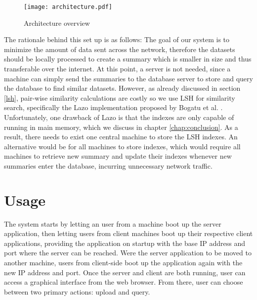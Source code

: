 \begin{figure}[h]
    \centering
    \texttt{[image: architecture.pdf]}
    \caption{Architecture overview}
    \label{fig:architecture}
\end{figure}

The rationale behind this set up is as follows: The goal of our system is to minimize the amount of data sent across the network, therefore the datasets should be locally processed to create a summary which is smaller in size and thus transferable over the internet. At this point, a server is not needed, since a machine can simply send the summaries to the database server to store and query the database to find similar datasets. However, as already discussed in section \ref{lsh}, pair-wise similarity calculations are costly so we use LSH for similarity search, specifically the Lazo implementation proposed by Bogatu et al. \cite{lazo}. Unfortunately, one drawback of Lazo is that the indexes are only capable of running in main memory, which we discuss in chapter \ref{chap:conclusion}. As a result, there needs to exist one central machine to store the LSH indexes. An alternative would be for all machines to store indexes, which would require all machines to retrieve new summary and update their indexes whenever new summaries enter the database, incurring unnecessary network traffic.

\section{Usage}

The system starts by letting an user from a machine boot up the server application, then letting users from client machines boot up their respective client applications, providing the application on startup with the base IP address and port where the server can be reached. Were the server application to be moved to another machine, users from client-side boot up the application again with the new IP address and port. Once the server and client are both running, user can access a graphical interface from the web browser. From there, user can choose between two primary actions: upload and query.

